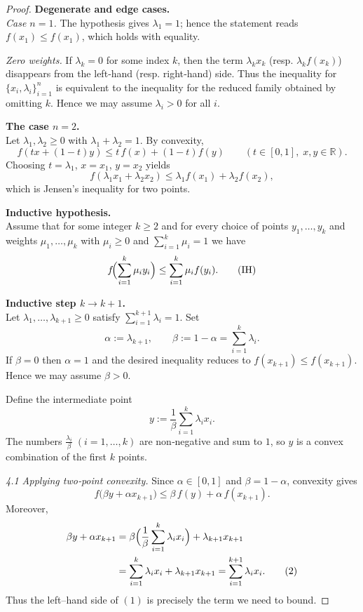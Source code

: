 \begin{proof}
\textbf{Degenerate and edge cases.}\\[4pt]
\emph{Case \(n=1\).}  
The hypothesis gives \(\lambda_{1}=1\); hence the statement reads  
\(f(x_{1})\le f(x_{1})\), which holds with equality.

\emph{Zero weights.}  
If \(\lambda_{k}=0\) for some index \(k\), then the term \(\lambda_{k}x_{k}\) (resp. \(\lambda_{k}f(x_{k})\)) disappears from the left‑hand (resp. right‑hand) side.  Thus the inequality for \(\{x_{i},\lambda_{i}\}_{i=1}^{n}\) is equivalent to the inequality for the reduced family obtained by omitting \(k\).  Hence we may assume \(\lambda_{i}>0\) for all \(i\).

\medskip
\textbf{The case \(n=2\).}\\[4pt]
Let \(\lambda_{1},\lambda_{2}\ge0\) with \(\lambda_{1}+\lambda_{2}=1\).  By convexity,
\[
f(t x+(1-t)y)\le t\,f(x)+(1-t)f(y)\qquad (t\in[0,1],\;x,y\in\mathbb R).
\]
Choosing \(t=\lambda_{1}\), \(x=x_{1}\), \(y=x_{2}\) yields
\[
f(\lambda_{1}x_{1}+\lambda_{2}x_{2})\le
\lambda_{1}f(x_{1})+\lambda_{2}f(x_{2}),
\]
which is Jensen’s inequality for two points.

\medskip
\textbf{Inductive hypothesis.}\\[4pt]
Assume that for some integer \(k\ge2\) and for every choice of points
\(y_{1},\dots ,y_{k}\) and weights \(\mu_{1},\dots ,\mu_{k}\) with \(\mu_{i}\ge0\) and
\(\sum_{i=1}^{k}\mu_{i}=1\) we have
\begin{equation}
f\!\Bigl(\sum_{i=1}^{k}\mu_{i}y_{i}\Bigr)\le
\sum_{i=1}^{k}\mu_{i}f(y_{i}). \tag{IH}
\end{equation}

\medskip
\textbf{Inductive step \(k\to k+1\).}\\[4pt]
Let \(\lambda_{1},\dots ,\lambda_{k+1}\ge0\) satisfy \(\sum_{i=1}^{k+1}\lambda_{i}=1\).
Set
\[
\alpha:=\lambda_{k+1},\qquad
\beta:=1-\alpha=\sum_{i=1}^{k}\lambda_{i}.
\]
If \(\beta=0\) then \(\alpha=1\) and the desired inequality reduces to
\(f(x_{k+1})\le f(x_{k+1})\).  Hence we may assume \(\beta>0\).

Define the intermediate point
\[
y:=\frac{1}{\beta}\sum_{i=1}^{k}\lambda_{i}x_{i}.
\]
The numbers \(\frac{\lambda_{i}}{\beta}\;(i=1,\dots ,k)\) are non‑negative and sum to \(1\), so \(y\) is a convex combination of the first \(k\) points.

\smallskip
\emph{4.1 Applying two‑point convexity.}  
Since \(\alpha\in[0,1]\) and \(\beta=1-\alpha\), convexity gives
\begin{equation}
f\bigl(\beta y+\alpha x_{k+1}\bigr)\le
\beta\,f(y)+\alpha\,f(x_{k+1}). \tag{1}
\end{equation}
Moreover,
\begin{align*}
\beta y+\alpha x_{k+1}
   &=\beta\Bigl(\frac{1}{\beta}\sum_{i=1}^{k}\lambda_{i}x_{i}\Bigr)
     +\lambda_{k+1}x_{k+1} \\
   &=\sum_{i=1}^{k}\lambda_{i}x_{i}+\lambda_{k+1}x_{k+1}
   =\sum_{i=1}^{k+1}\lambda_{i}x_{i}. \tag{2}
\end{align*}
Thus the left–hand side of \((1)\) is precisely the term we need to bound.


\end{proof}
